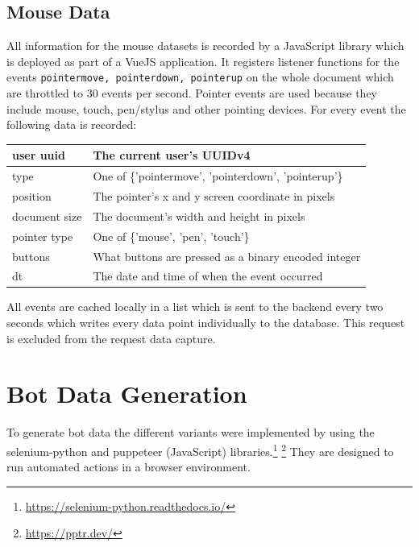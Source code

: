 \documentclass[
    fontsize=12pt,
    headings=small,
    parskip=half,           %
    bibliography=totoc,
    numbers=noenddot,       %
    open=any,               %
    final,                   %
    table
]{scrreprt}
\begin{document}
\subsection{Mouse Data}

All information for the mouse datasets is recorded by a JavaScript library which is deployed as part of a VueJS application. It registers listener functions for the events \lstinline{pointermove, pointerdown, pointerup} on the whole document which are throttled to $30$ events per second. Pointer events are used because they include mouse, touch, pen/stylus and other pointing devices. For every event the following data is recorded:

\begin{table}[]
\begin{tabular}{|l|l|}
\hline
user uuid & The current user's UUIDv4 \\ \hline
type & One of \{'pointermove', 'pointerdown', 'pointerup'\} \\ \hline
position & The pointer's x and y screen coordinate in pixels \\ \hline
document size & The document's width and height in pixels \\ \hline
pointer type & One of \{'mouse', 'pen', 'touch'\} \\ \hline
buttons & What buttons are pressed as a binary encoded integer \\ \hline
dt & The date and time of when the event occurred \\ \hline

\end{tabular}
\end{table}

All events are cached locally in a list which is sent to the backend every two seconds which writes every data point individually to the database. This request is excluded from the request data capture.

\section{Bot Data Generation}

To generate bot data the different variants were implemented by using the selenium-python and puppeteer (JavaScript) libraries.\footnote{\url{https://selenium-python.readthedocs.io/}} \footnote{\url{https://pptr.dev/}} They are designed to run automated actions in a browser environment.
\end{document}
